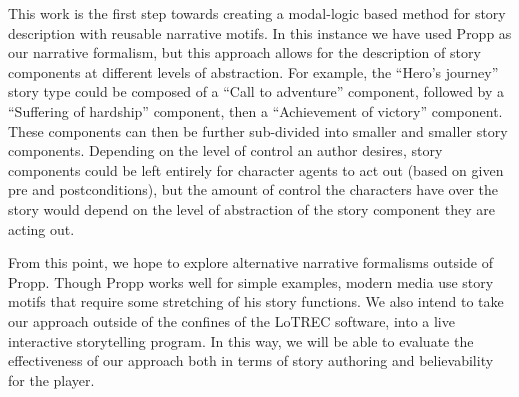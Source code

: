 \documentclass{llncs}
\begin{document}
This work is the first step towards creating a modal-logic based method for story description with reusable narrative motifs. In this instance we have used Propp as our narrative formalism, but this approach allows for the description of story components at different levels of abstraction. For example, the ``Hero's journey'' story type could be composed of a ``Call to adventure'' component, followed by a ``Suffering of hardship'' component, then a ``Achievement of victory'' component. These components can then be further sub-divided into smaller and smaller story components. Depending on the level of control an author desires, story components could be left entirely for character agents to act out (based on given pre and postconditions), but the amount of control the characters have over the story would depend on the level of abstraction of the story component they are acting out.

From this point, we hope to explore alternative narrative formalisms outside of Propp. Though Propp works well for simple examples, modern media use story motifs that require some stretching of his story functions. We also intend to take our approach outside of the confines of the LoTREC software, into a live interactive storytelling program. In this way, we will be able to evaluate the effectiveness of our approach both in terms of story authoring and believability for the player.


\end{document}
